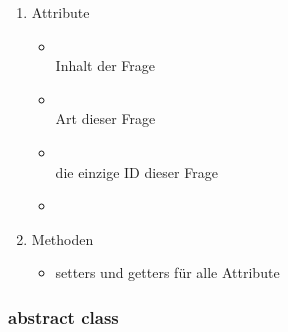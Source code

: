 \documentclass[a4paper]{scrreprt}
\begin{document}
{                    \begin{enumerate}
                        \item Attribute
                            \begin{itemize}
                                \item {\large {}}\\
                                    Inhalt der Frage
                                \item {\large {}}\\
                                    Art dieser Frage
                                \item {\large {}}\\
                                    die einzige ID dieser Frage
                                \item {\large {}}
                            \end{itemize}
                        \item Methoden
                            \begin{itemize}
                                \item {\large setters und getters für alle Attribute}
                            \end{itemize}
                    \end{enumerate}

                \subsubsection{abstract class } %

}
\end{document}
